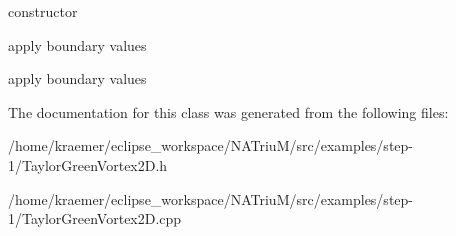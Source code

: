 constructor 

apply boundary values

apply boundary values 

The documentation for this class was generated from the following files\-:\begin{DoxyCompactItemize}
\item 
/home/kraemer/eclipse\-\_\-workspace/\-N\-A\-Triu\-M/src/examples/step-\/1/Taylor\-Green\-Vortex2\-D.\-h\item 
/home/kraemer/eclipse\-\_\-workspace/\-N\-A\-Triu\-M/src/examples/step-\/1/Taylor\-Green\-Vortex2\-D.\-cpp\end{DoxyCompactItemize}
